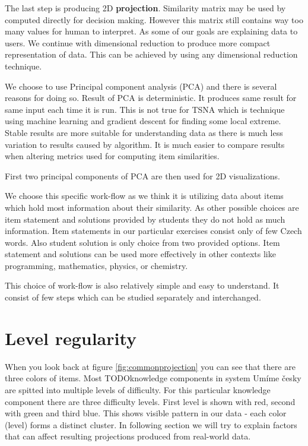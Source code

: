 \documentclass[
  digital, %
  table,   %
  nolof,     %
  nolot,     %
  nocover
]{fithesis3}
\begin{document}

The last step is producing 2D \textbf{projection}. Similarity matrix may be used by computed directly for decision making. However this matrix still contains way too many values for human to interpret. As some of our goals are explaining data to users. We continue with dimensional reduction to produce more compact representation of data. This can be
achieved by using any dimensional reduction technique.


We choose to use Principal component analysis (PCA) and there is several
reasons for doing so. Result of PCA is deterministic. It produces same
result for same input each time it is run. This is not true for TSNA which is technique
using machine learning and gradient descent for finding some local
extreme. Stable results are more suitable for understanding data as
there is much less variation to results caused by algorithm. It is much easier
to compare results when altering metrics used for computing item
similarities.

First two principal components of PCA are then used for 2D
visualizations.


We choose this specific work-flow as we think it is utilizing data about
items which hold most information about their similarity. As other
possible choices are item statement and solutions provided by students
they do not hold as much information. Item statements in our particular
exercises consist only of few Czech words. Also student solution is only
choice from two provided options. Item statement and solutions can be
used more effectively in other contexts like programming, mathematics,
physics, or chemistry.

This choice of work-flow is also relatively simple and easy to
understand. It consist of few steps which can be studied separately and
interchanged.

\section{Level regularity}\label{level-regularity}


When you look back at figure \ref{fig:commonprojection} you can see that
there are three colors of items. Most TODOknowledge components in system
Umíme česky are spitted into multiple levels of difficulty. For this
particular knowledge component there are three difficulty levels. First
level is shown with red, second with green and third blue. This shows
visible pattern in our data - each color (level) forms a distinct
cluster. In following section we will try to explain factors that can
affect resulting projections produced from real-world data.
\end{document}
